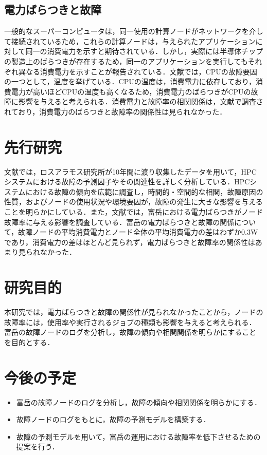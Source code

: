\documentclass[a4paper,11pt,twocolumn]{jsarticle}
\begin{document}
\subsection{電力ばらつきと故障}
一般的なスーパーコンピュータは，同一使用の計算ノードがネットワークを介して接続されているため，これらの計算ノードは，与えられたアプリケーションに対して同一の消費電力を示すと期待されている．しかし，実際には半導体チップの製造上のばらつきが存在するため，同一のアプリケーションを実行してもそれぞれ異なる消費電力を示すことが報告されている．文献\cite{ref}では，CPUの故障要因の一つとして，温度を挙げている．CPUの温度は，消費電力に依存しており，消費電力が高いほどCPUの温度も高くなるため，消費電力のばらつきがCPUの故障に影響を与えると考えられる．消費電力と故障率の相関関係は，文献\cite{ref:}で調査されており，消費電力のばらつきと故障率の関係性は見られなかった．

\section{先行研究}
文献\cite{ref:}では，ロスアラモス研究所が10年間に渡り収集したデータを用いて，HPCシステムにおける故障の予測因子やその関連性を詳しく分析している．HPCシステムにおける故障の傾向を広範に調査し，時間的・空間的な相関，故障原因の性質，およびノードの使用状況や環境要因が，故障の発生に大きな影響を与えることを明らかにしている．また，文献\cite{ref:}では，富岳における電力ばらつきがノード故障率に与える影響を調査している．富岳の電力ばらつきと故障の関係について，故障ノードの平均消費電力とノード全体の平均消費電力の差はわずか0.3Wであり，消費電力の差はほとんど見られず，電力ばらつきと故障率の関係性はあまり見られなかった．

\section{研究目的}
本研究では，電力ばらつきと故障の関係性が見られなかったことから，ノードの故障率には，使用率や実行されるジョブの種類も影響を与えると考えられる．
富岳の故障ノードのログを分析し，故障の傾向や相関関係を明らかにすることを目的とする．


\section{今後の予定}

\begin{itemize}
  \item 富岳の故障ノードのログを分析し，故障の傾向や相関関係を明らかにする．
  \item 故障ノードのログをもとに，故障の予測モデルを構築する．
  \item 故障の予測モデルを用いて，富岳の運用における故障率を低下させるための提案を行う．
\end{itemize}



\end{document}
